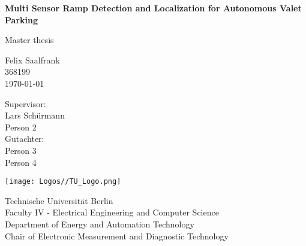 \begin{titlepage}
	\begin{center} %
		\vspace*{1cm} %

		\Huge
		\textbf{Multi Sensor Ramp Detection and Localization for Autonomous Valet Parking}

		\vspace{0.5cm}
		Master thesis

		\vspace{1.5cm}
		\LARGE{Felix Saalfrank}\\
		\large 368199\\
		\vspace{1cm}
		\today

		\vspace{1.5cm}

		Supervisor:\\
		Lars Sch\"urmann\\
		Person 2\\
		Gutachter:\\
		Person 3\\
		Person 4

		\vfill

		\vspace{0.8cm}

		\texttt{[image: Logos//TU\_Logo.png]}

		Technische Universit\"at Berlin\\
		Faculty IV - Electrical Engineering and Computer Science\\
		Department of Energy and Automation Technology\\
		Chair of Electronic Measurement and Diagnostic Technology\\
	\end{center}
\end{titlepage}